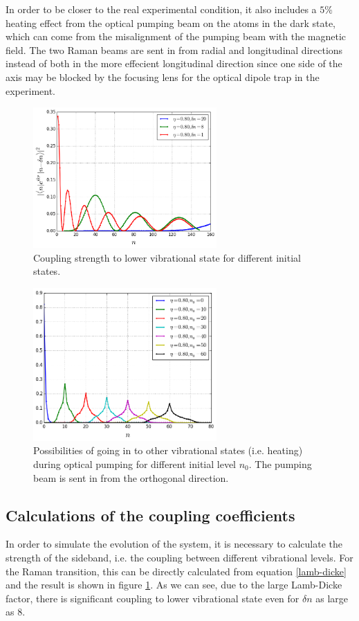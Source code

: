 \documentclass[aps,twocolumn,secnumarabic,balancelastpage,amsmath,amssymb,nofootinbib]{revtex4}
\begin{document}
In order to be closer to the real experimental condition, it also includes a $5\%$ heating effect from the optical pumping beam on the atoms in the dark state, which can come from the misalignment of the pumping beam with the magnetic field. The two Raman beams are sent in from radial and longitudinal directions instead of both in the more effecient longitudinal direction since one side of the axis may be blocked by the focusing lens for the optical dipole trap in the experiment.

\begin{figure}
  \begin{center}
    \includegraphics[width=7cm]{../raman_0.8_1.png}
  \end{center}
  \caption{Coupling strength to lower vibrational state for different initial states.}
  \label{fig-raman-curve}
\end{figure}
\begin{figure}
  \begin{center}
    \includegraphics[width=7cm]{../pump_0.8_0_curve.png}
  \end{center}
  \caption{Possibilities of going in to other vibrational states (i.e. heating) during optical pumping for different initial level $n_0$. The pumping beam is sent in from the orthogonal direction.}
  \label{fig-pump-curve}
\end{figure}
\subsection{Calculations of the coupling coefficients}
In order to simulate the evolution of the system, it is necessary to calculate the strength of the sideband, i.e. the coupling between different vibrational levels. For the Raman transition, this can be directly calculated from equation \ref{lamb-dicke} and the result is shown in figure \ref{fig-raman-curve}. As we can see, due to the large Lamb-Dicke factor, there is significant coupling to lower vibrational state even for $\delta n$ as large as $8$.\\
\end{document}
